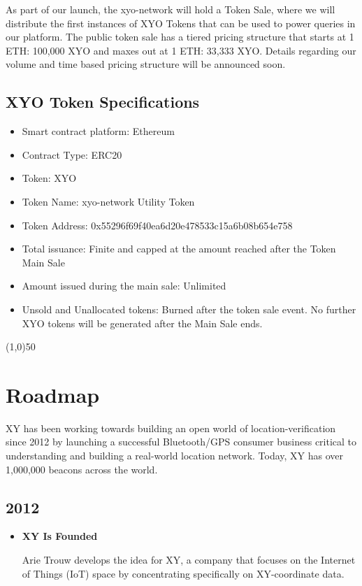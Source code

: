 \documentclass{article}
\begin{document}
As part of our launch, the \Gls{xyo-network} will hold a Token Sale, where we will distribute the first instances of XYO Tokens that can be used to power queries in our platform. The public token sale has a tiered pricing structure that starts at 1 ETH: 100,000 XYO and maxes out at 1 ETH: 33,333 XYO. Details regarding our volume and time based pricing structure will be announced soon.

\subsection {XYO Token Specifications}
\begin{itemize}
\item Smart contract platform: Ethereum
\item Contract Type: ERC20
\item Token: XYO
\item Token Name: \Gls{xyo-network} Utility Token
\item Token Address: 0x55296f69f40ea6d20e478533c15a6b08b654e758
\item Total issuance: Finite and capped at the amount reached after the Token Main Sale
\item Amount issued during the main sale: Unlimited
\item Unsold and Unallocated tokens: Burned after the token sale event. No further XYO tokens will be generated after the Main Sale ends.
\end{itemize}

\begin{center}
\line(1,0){50}
\end{center}

\section{Roadmap}
XY has been working towards building an open world of location-verification since 2012 by launching a successful Bluetooth/GPS consumer business critical to understanding and building a real-world location network. Today, XY has over 1,000,000 beacons across the world.

\subsection{2012}
\begin{itemize}
\item \textbf{XY Is Founded}

Arie Trouw develops the idea for XY, a company that focuses on the Internet of Things (IoT) space by concentrating specifically on XY-coordinate data.
\end{itemize}
\end{document}
